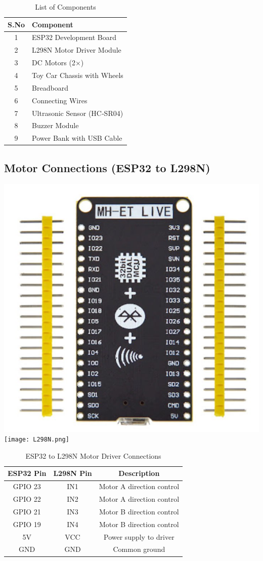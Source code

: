\documentclass[conference]{IEEEtran}
\begin{document}
\begin{table}[!ht]
\centering
\caption{List of Components}
\label{table:components}
\begin{tabular}{|c|l|}
\hline
\textbf{S.No} & \textbf{Component} \\
\hline
1 & ESP32 Development Board \\
2 & L298N Motor Driver Module \\
3 & DC Motors (2×) \\
4 & Toy Car Chassis with Wheels \\
5 & Breadboard \\
6 & Connecting Wires \\
7 & Ultrasonic Sensor (HC‑SR04) \\
8 & Buzzer Module \\
9 & Power Bank with USB Cable \\
\hline
\end{tabular}
\end{table}

\subsection{Motor Connections (ESP32 to L298N)}
\includegraphics[width=0.4\linewidth]{ESP32.png}
\texttt{[image: L298N.png]}
\begin{table}[!ht]
\centering
\caption{ESP32 to L298N Motor Driver Connections}
\begin{tabular}{|c|c|c|}
\hline
\textbf{ESP32 Pin} & \textbf{L298N Pin} & \textbf{Description} \\
\hline
GPIO 23 & IN1 & Motor A direction control \\
GPIO 22 & IN2 & Motor A direction control \\
GPIO 21 & IN3 & Motor B direction control \\
GPIO 19 & IN4 & Motor B direction control \\
5V       & VCC & Power supply to driver \\
GND      & GND & Common ground \\
\hline
\end{tabular}
\end{table}
\end{document}
